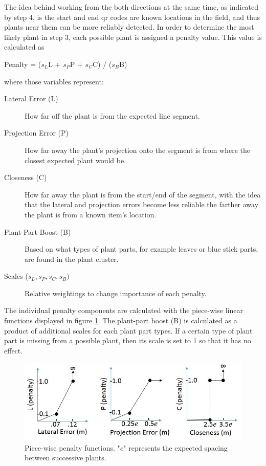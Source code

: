 The idea behind working from the both directions at the same time, as indicated by step 4, is the start and end \ac{qr} codes are known locations in the field, and thus plants near them can be more reliably detected.  In order to determine the most likely plant in step 3, each possible plant is assigned a penalty value.  This value is calculated as

\begin{center}
Penalty = ($s_L$L + $s_P$P + $s_C$C) / ($s_B$B)
\end{center}
where those variables represent:

\begin{description}
\item[Lateral Error (L)] How far off the plant is from the expected line segment.
\item[Projection Error (P)] How far away the plant's projection onto the segment is from where the closest expected plant would be.
\item[Closeness (C)] How far away the plant is from the start/end of the segment, with the idea that the lateral and projection errors become less reliable the farther away the plant is from a known item's location.
\item[Plant-Part Boost (B)] Based on what types of plant parts, for example leaves or blue stick parts, are found in the plant cluster.
\item[Scales ($s_L,s_P,s_C,s_B)$] Relative weightings to change importance of each penalty.
\end{description}

The individual penalty components are calculated with the piece-wise linear functions displayed in figure \ref{figure:piecewise_penalties}.  The plant-part boost (B) is calculated as a product of additional scales for each plant part types.  If a certain type of plant part is missing from a possible plant, then its scale is set to 1 so that it has no effect.  

\begin{figure}
	\centering
    \includegraphics[width=5.5in]{figures/piece_wise.jpg}
    \caption[Penalty functions]{Piece-wise penalty functions. "$e$" represents the expected spacing between successive plants.}
    \label{figure:piecewise_penalties}
\end{figure}

